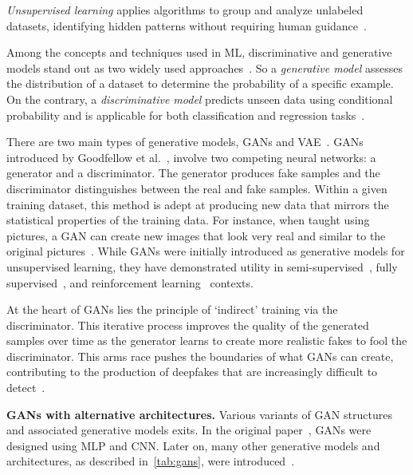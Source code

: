 \textit{Unsupervised learning} applies algorithms to group and analyze unlabeled datasets,
identifying hidden patterns without requiring human guidance~\cite{supervised-unsupervised}.

Among the concepts and techniques used in \ac{ML}, discriminative and generative models stand out
as two widely used approaches~\cite{generative-discriminative}. So a \textit{generative model}
assesses the distribution of a dataset to determine the probability of a specific example. On the
contrary, a \textit{discriminative model} predicts unseen data using conditional probability
and is applicable for both classification and regression tasks~\cite{generative-discriminative2}.

There are two main types of generative models, \ac{GAN}s and \ac{VAE}~\cite{generative-discriminative}. \ac{GAN}s
introduced by Goodfellow et al.~\cite{goodfellow2014generative}, involve two
competing neural networks: a generator and a discriminator. The generator produces
fake samples and the discriminator distinguishes between the real and fake samples.
Within a given training dataset, this method is adept at producing new data that mirrors the
statistical properties of the training data. For instance, when taught using pictures, a \ac{GAN}
can create new images that look very real and similar to the original pictures~\cite{enwiki:1169846514}.
While \ac{GAN}s were initially introduced as generative models for unsupervised learning,
they have demonstrated utility in semi-supervised~\cite{salimans2016improved},
fully supervised~\cite{pix2pix2017}, and reinforcement learning~\cite{ho2016generative} contexts.

At the heart of \ac{GAN}s lies the principle of `indirect' training via the discriminator.
This iterative process improves the quality of the generated samples over time as
the generator learns to create more realistic fakes to fool the discriminator. This
arms race pushes the boundaries of what \ac{GAN}s can create, contributing to the
production of deepfakes that are increasingly difficult to detect~\cite{brock2019large}.

\textbf{\ac{GAN}s with alternative architectures.} Various variants of \ac{GAN} structures
and associated generative models exits. In the original paper~\cite{goodfellow2014generative},
\ac{GAN}s were designed using \ac{MLP} and \ac{CNN}. Later on, many other generative models and
architectures, as described in~\autoref{tab:gans}, were introduced~\cite{gans-versions}.

